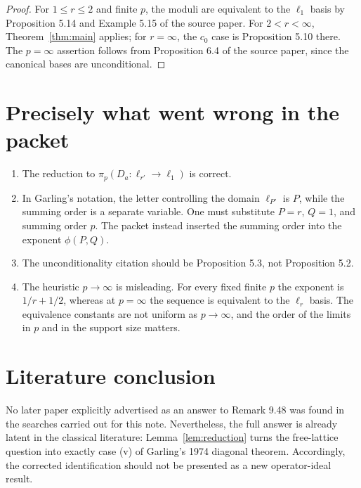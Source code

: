 \documentclass[11pt]{article}
\theoremstyle{remark}
\begin{document}
\begin{proof}
For $1\le r\le2$ and finite $p$, the moduli are equivalent to the
$\ell_1$ basis by Proposition 5.14 and Example 5.15 of the source paper.
For $2<r<\infty$, Theorem~\ref{thm:main} applies; for $r=\infty$, the
$c_0$ case is Proposition 5.10 there.  The $p=\infty$ assertion follows
from Proposition 6.4 of the source paper, since the canonical bases are
unconditional.
\end{proof}

\section{Precisely what went wrong in the packet}

\begin{enumerate}[leftmargin=2em]
\item The reduction to $\pi_p(D_a:\ell_{r'}\to\ell_1)$ is correct.
\item In Garling's notation, the letter controlling the domain
      $\ell_{P'}$ is $P$, while the summing order is a separate variable.
      One must substitute $P=r$, $Q=1$, and summing order $p$.  The packet
      instead inserted the summing order into the exponent
      $\phi(P,Q)$.
\item The unconditionality citation should be Proposition 5.3, not
      Proposition 5.2.
\item The heuristic $p\to\infty$ is misleading.  For every fixed finite
      $p$ the exponent is $1/r+1/2$, whereas at $p=\infty$ the sequence is
      equivalent to the $\ell_r$ basis.  The equivalence constants are not
      uniform as $p\to\infty$, and the order of the limits in $p$ and in
      the support size matters.
\end{enumerate}

\section{Literature conclusion}

No later paper explicitly advertised as an answer to Remark 9.48 was found
in the searches carried out for this note.  Nevertheless, the full answer
is already latent in the classical literature: Lemma~\ref{lem:reduction}
turns the free-lattice question into exactly case (v) of Garling's 1974
diagonal theorem.  Accordingly, the corrected identification should not be
presented as a new operator-ideal result.
\end{document}

